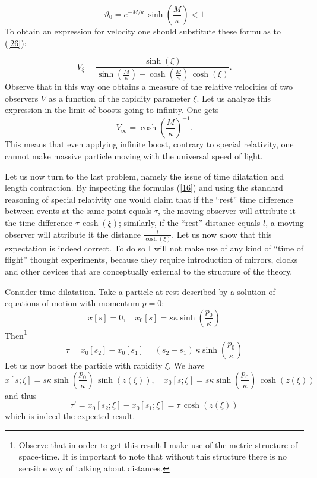 \documentclass[a4paper,a4paper]{article}
\begin{document}
\begin{equation}\label{29a}
  \vartheta_0 = e^{-M/\kappa}\, \sinh\left(\frac{M}\kappa\right) <1
\end{equation}
To obtain an expression for velocity one should substitute these formulas to (\ref{26}):

\begin{equation}\label{30}
 V_\xi = \frac{\sinh(\xi)}{\sinh\left(\frac{M}{\kappa}\right) +\cosh\left(\frac{M}{\kappa}\right)\, \cosh(\xi) }.
\end{equation}
Observe that in this way one obtains a measure of the relative velocities of two observers $V$ as a function of the rapidity parameter $\xi$. Let us analyze this expression in the limit of  boosts going to infinity. One gets
\begin{equation}\label{31}
 V_\infty = \cosh\left(\frac M\kappa\right)^{-1}.
\end{equation}
This means that even applying infinite boost, contrary to special relativity, one cannot make massive particle moving with the universal speed of light.
\newline

Let us now turn to the last problem, namely the issue of time dilatation and length contraction. By inspecting the formulas (\ref{16}) and using the standard reasoning of special relativity one would claim that if the ``rest'' time difference between events at the same point equals $\tau$, the moving observer will attribute it the time difference $\tau\, \cosh(\xi)$; similarly, if the ``rest'' distance equals $l$, a moving observer will attribute it the distance $\frac{l}{\cosh(\xi)}$. Let us now show that this expectation is indeed correct. To do so I will not make use of any kind of ``time of flight'' thought experiments, because they require introduction of mirrors, clocks and other devices that are conceptually external to the structure of the theory.

Consider time dilatation. Take a particle at rest described by a solution of equations of motion with momentum $p=0$:
\begin{equation}\label{32a}
  x[s] =0, \quad x_0[s] = s\kappa\sinh\left(\frac{p_0}{\kappa}\right)
\end{equation}
Then\footnote{Observe that in order to get this result I make use of the metric structure of space-time. It is important to note that without this structure there is no sensible way of talking about distances.}
\begin{equation}\label{32b}
 \tau = x_0[s_2] - x_0[s_1] = (s_2 - s_1)\, \kappa\sinh\left(\frac{p_0}{\kappa}\right)
\end{equation}
Let us now boost the particle with rapidity $\xi$. We have
\begin{equation}\label{32c}
  x[s;\xi] =s\kappa\sinh\left(\frac{p_0}{\kappa}\right)\, \sinh(z(\xi)), \quad x_0[s;\xi] = s\kappa\sinh\left(\frac{p_0}{\kappa}\right)\, \cosh(z(\xi))
\end{equation}
and thus
\begin{equation}\label{32d}
  \tau' = x_0[s_2;\xi] - x_0[s_1;\xi] = \tau \, \cosh(z(\xi))
\end{equation}
which is indeed the expected result.
\end{document}
